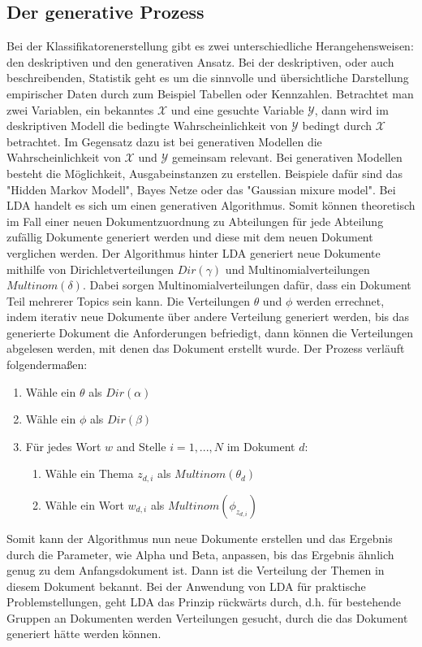 \documentclass[german,version-2020-11]{uzl-thesis}
\begin{document}
\subsection{Der generative Prozess} 
Bei der Klassifikatorenerstellung gibt es zwei unterschiedliche Herangehensweisen: den deskriptiven und den generativen Ansatz. Bei der deskriptiven, oder auch beschreibenden, Statistik geht es um die sinnvolle und übersichtliche Darstellung empirischer Daten durch zum Beispiel Tabellen oder Kennzahlen. Betrachtet man zwei Variablen, ein bekanntes $\mathcal{X}$ und eine gesuchte Variable $\mathcal{Y}$, dann wird im deskriptiven Modell die bedingte Wahrscheinlichkeit von $\mathcal{Y}$ bedingt durch $\mathcal{X}$ betrachtet. Im Gegensatz dazu ist bei generativen Modellen die Wahrscheinlichkeit von $\mathcal{X}$ und $\mathcal{Y}$ gemeinsam relevant. Bei generativen Modellen besteht die Möglichkeit, Ausgabeinstanzen zu erstellen. Beispiele dafür sind das "Hidden Markov Modell", Bayes Netze oder das "Gaussian mixure model". Bei LDA handelt es sich um einen generativen Algorithmus. Somit können theoretisch im Fall einer neuen Dokumentzuordnung zu Abteilungen für jede Abteilung zufällig Dokumente generiert werden und diese mit dem neuen Dokument verglichen werden. Der Algorithmus hinter LDA generiert neue Dokumente mithilfe von Dirichletverteilungen $Dir(\gamma)$ und Multinomialverteilungen $Multinom(\delta)$. Dabei sorgen Multinomialverteilungen dafür, dass ein Dokument Teil mehrerer Topics sein kann. Die Verteilungen $\theta$ und $\phi$ werden errechnet, indem iterativ neue Dokumente über andere Verteilung generiert werden, bis das generierte Dokument die Anforderungen befriedigt, dann können die Verteilungen abgelesen werden, mit denen das Dokument erstellt wurde. Der Prozess verläuft folgendermaßen: 
\begin{enumerate}
	\item Wähle ein $\theta$ als $Dir(\alpha)$
	\item Wähle ein $\phi$ als $Dir(\beta)$
	\item Für jedes Wort $w$ and Stelle $i = 1,...,N$ im Dokument $d$: 
	\begin{enumerate}
		\item Wähle ein Thema $z_{d,i}$ als $Multinom(\theta_d)$
		\item Wähle ein Wort $w_{d,i}$ als $Multinom(\phi_z_{d,i})$
	\end{enumerate}
\end{enumerate}

Somit kann der Algorithmus nun neue Dokumente erstellen und das Ergebnis durch die Parameter, wie Alpha und Beta, anpassen, bis das Ergebnis ähnlich genug zu dem Anfangsdokument ist. Dann ist die Verteilung der Themen in diesem Dokument bekannt. Bei der Anwendung von LDA für praktische Problemstellungen, geht LDA das Prinzip rückwärts durch, d.h. für bestehende Gruppen an Dokumenten werden Verteilungen gesucht, durch die das Dokument generiert hätte werden können. \\
\end{document}
